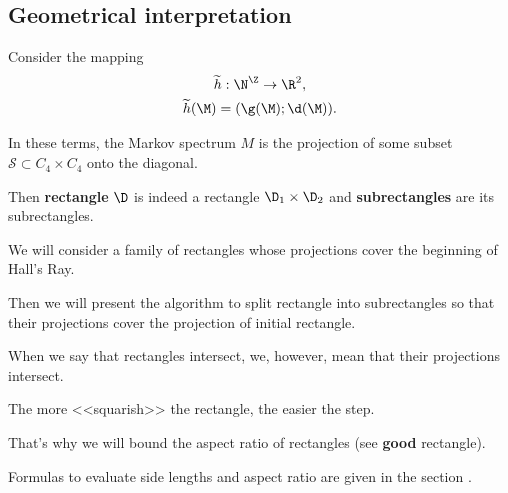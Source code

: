 \subsection{Geometrical interpretation}

Consider the mapping 
\begin{gather*}
	\widetilde{h}: \N^\Z \rightarrow \R^2,\\
	\widetilde{h}(\M) = (\g(\M); \d(\M)).
\end{gather*}

In these terms,
the Markov spectrum $M$
is the projection of some subset $\mathcal{S} \subset C_4 \times C_4$ onto the diagonal.

Then \textbf{rectangle} $\D$ is indeed a rectangle $\D_1 \times \D_2$
and \textbf{subrectangles} are its subrectangles.

We will consider a family of rectangles whose projections cover the beginning of Hall's Ray.

Then we will present the algorithm to split rectangle into subrectangles
so that their projections cover the projection of initial rectangle.

When we say that rectangles intersect, we, however, mean that their projections intersect.

The more <<squarish>> the rectangle, the easier the step.

That's why we will bound the aspect ratio of rectangles (see \textbf{good} rectangle).

Formulas to evaluate side lengths and aspect ratio
are given in the section .
